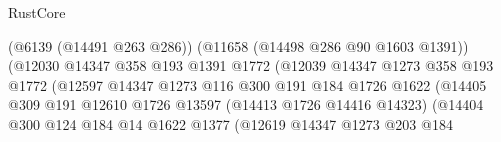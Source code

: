 \begin{lexlean}{RustCore}
\begin{coremodule}
                                                (@6139 (@14491 @263 @286))
                                                (@11658 (@14498 @286 @90 @1603 @1391))
                                                (@12030
                                                  @14347
                                                  @358
                                                  @193
                                                  @1391
                                                  @1772
                                                  (@12039
                                                    @14347
                                                    @1273
                                                    @358
                                                    @193
                                                    @1772
                                                    (@12597
                                                      @14347
                                                      @1273
                                                      @116
                                                      @300
                                                      @191
                                                      @184
                                                      @1726
                                                      @1622
                                                      (@14405
                                                        @309
                                                        @191
                                                        @12610
                                                        @1726
                                                        @13597
                                                        (@14413 @1726 @14416 @14323)
                                                        (@14404
                                                          @300
                                                          @124
                                                          @184
                                                          @14
                                                          @1622
                                                          @1377
                                                          (@12619
                                                            @14347
                                                            @1273
                                                            @203
                                                            @184

\end{coremodule}
\end{lexlean}
